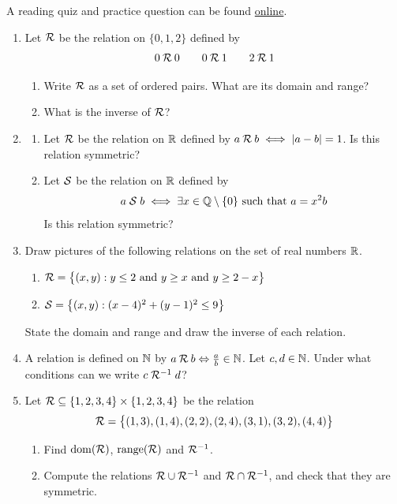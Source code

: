 \begin{exercises}{}{}
	A reading quiz and practice question can be found \href{http://www.math.uci.edu/~ndonalds/math13/selftest/7-1-relations.html}{online}.
	
	\begin{enumerate}
	  \item Let $\mathcal{R}$ be the relation on $\{0,1,2\}$ defined by
	  \[
	  	0\mathbin{\mathcal{R}} 0\qquad 0\mathbin{\mathcal{R}} 1\qquad 2\mathbin{\mathcal{R}} 1\]
	  \begin{enumerate}
	    \item Write $\mathcal{R}$ as a set of ordered pairs. What are its domain and range?
	    \item What is the inverse of $\mathcal{R}$?
		\end{enumerate}
		
		\item\begin{enumerate}
		  \item Let $\mathcal{R}$ be the relation on $\mathbb{R}$ defined by $a\mathbin{\mathcal{R}} b\iff\left| a-b\right|=1$. Is this relation symmetric? 
	 		\item Let $\mathcal{S}$ be the relation on $\mathbb{R}$ defined by 
			\[
				a \mathrel{\mathcal{S}} b \iff \exists x \in \mathbb{Q}\setminus\{0\} \text{ such that } a=x^2b
			\]
			Is this relation symmetric? 
		\end{enumerate}
		
	  
		\item Draw pictures of the following relations on the set of real numbers $\mathbb{R}$.
		\begin{enumerate}
			\item $\mathcal{R}=\bigl\{(x,y):y\le 2\text{ and }y\ge x\text{ and }y\ge 2-x\bigr\}$
			\item $\mathcal{S}=\bigl\{(x,y):(x-4)^2+(y-1)^2\le 9\bigr\}$
		\end{enumerate}
		State the domain and range and draw the inverse of each relation.
		
		
		\item A relation is defined on $\mathbb{N}$ by $a\mathbin{\mathcal{R}} b \Leftrightarrow \frac ab\in\mathbb{N}$. Let $c,d\in\mathbb{N}$. Under what conditions can we write $c\mathrel{\mathcal{R}^{-1}} d$?
		
		
		\item Let $\mathcal{R}\subseteq\{1,2,3,4\}\times\{1,2,3,4\}$ be the relation
		\[
			\mathcal{R}=\bigl\{(1,3),(1,4),(2,2),(2,4),(3,1),(3,2),(4,4)\bigr\}
		\]
		\begin{enumerate}
		  \item Find $\operatorname{dom}(\mathcal{R})$, $\operatorname{range}(\mathcal{R})$ and $\mathcal{R}^{-1}$.
		  \item Compute the relations $\mathcal{R}\cup\mathcal{R}^{-1}$ and $\mathcal{R}\cap\mathcal{R}^{-1}$, and check that they are symmetric.
		\end{enumerate}
		

\end{enumerate}
\end{exercises}
